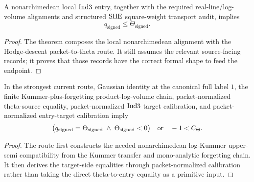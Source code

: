 \begin{theorem}
  \label{thm:nonarchimedean-entry-final-q-theta}
  \leanok
  A nonarchimedean local \(\mathrm{Ind3}\) entry, together with the required
  real-line/log-volume alignments and structured \(\mathrm{SHE}\) square-weight
  transport audit, implies
  \[
    q_{\mathrm{signed}}\le \Theta_{\mathrm{signed}}.
  \]
\end{theorem}

\begin{proof}
  The theorem composes the local nonarchimedean alignment with the
  Hodge-descent packet-to-theta route.  It still assumes the relevant
  source-facing records; it proves that those records have the correct formal
  shape to feed the endpoint.
\end{proof}

\begin{theorem}
  \label{thm:packet-calibrated-route}
  \leanok
  In the strongest current route, Gaussian identity at the canonical full
  label \(1\), the finite Kummer-plus-forgetting product-log-volume chain,
  packet-normalized theta-source equality, packet-normalized \(\mathrm{Ind3}\)
  target calibration, and packet-normalized entry-target calibration imply
  \[
    \bigl(q_{\mathrm{signed}}=\Theta_{\mathrm{signed}}
       \;\wedge\; \Theta_{\mathrm{signed}}<0\bigr)
       \quad\text{or}\quad
    -1<C_\Theta.
  \]
\end{theorem}

\begin{proof}
  The route first constructs the needed nonarchimedean log-Kummer upper-semi
  compatibility from the Kummer transfer and mono-analytic forgetting chain.
  It then derives the target-side equalities through packet-normalized
  calibration rather than taking the direct theta-to-entry equality as a
  primitive input.
\end{proof}

